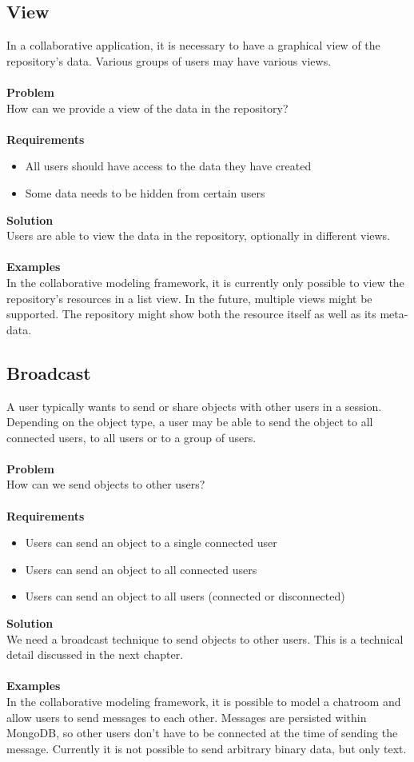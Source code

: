 \subsection{View}

In a collaborative application, it is necessary to have a graphical view of the repository's data. Various groups of users may have various views.
\\ \\
\textbf{Problem}
\\
How can we provide a view of the data in the repository?
\\ \\
\textbf{Requirements}
\begin{itemize}
\item{All users should have access to the data they have created}
\item{Some data needs to be hidden from certain users}
\end{itemize}
\textbf{Solution}
\\
Users are able to view the data in the repository, optionally in different views.
\\ \\
\textbf{Examples}
\\
In the collaborative modeling framework, it is currently only possible to view the repository's resources in a list view. In the future, multiple views might be supported. The repository might show both the resource itself as well as its meta-data.

\subsection{Broadcast}

A user typically wants to send or share objects with other users in a session. Depending on the object type, a user may be able to send the object to all connected users, to all users or to a group of users.
\\ \\
\textbf{Problem}
\\
How can we send objects to other users?
\\ \\
\textbf{Requirements}
\begin{itemize}
\item{Users can send an object to a single connected user}
\item{Users can send an object to all connected users}
\item{Users can send an object to all users (connected or disconnected)}
\end{itemize}
\textbf{Solution}
\\
We need a broadcast technique to send objects to other users. This is a technical detail discussed in the next chapter.
\\ \\
\textbf{Examples}
\\
In the collaborative modeling framework, it is possible to model a chatroom and allow users to send messages to each other. Messages are persisted within MongoDB, so other users don't have to be connected at the time of sending the message. Currently it is not possible to send arbitrary binary data, but only text.

